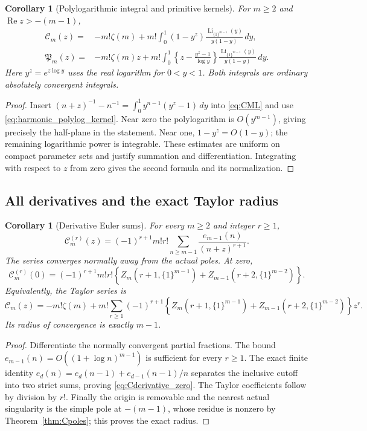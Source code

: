 \documentclass[11pt,a4paper]{article}
\numberwithin{equation}{section}
\newtheorem{corollary}[theorem]{Corollary}
\theoremstyle{definition}
\DeclareMathOperator{\Li}{Li}
\newcommand{\CM}{\mathcal C}
\newcommand{\re}{\operatorname{Re}}
\begin{document}
\begin{corollary}[Polylogarithmic integral and primitive kernels]
\label{cor:Cpolylog}
For $m\ge2$ and $\re z>-(m-1)$,
\begin{align}
 \CM_m(z)={}&-m!\zeta(m)
  +m!\int_0^1(1-y^z)
       \frac{\Li_{\{1\}^{m-1}}(y)}{y(1-y)}\,dy,
 \label{eq:Cpolylog}\\
 \mathfrak P_m(z)={}&-m!\zeta(m)z
  +m!\int_0^1\left\{z-\frac{y^z-1}{\log y}\right\}
       \frac{\Li_{\{1\}^{m-1}}(y)}{y(1-y)}\,dy.
 \label{eq:Ppolylog}
\end{align}
Here $y^z=e^{z\log y}$ uses the real logarithm for $0<y<1$.
Both integrals are ordinary absolutely convergent integrals.
\end{corollary}
\begin{proof}
Insert $(n+z)^{-1}-n^{-1}=\int_0^1y^{n-1}(y^z-1)\,dy$
into \eqref{eq:CML} and use \eqref{eq:harmonic_polylog_kernel}.
Near zero the polylogarithm is $O(y^{m-1})$, giving precisely
the half-plane in the statement. Near one, $1-y^z=O(1-y)$;
the remaining logarithmic power is integrable. These estimates are
uniform on compact parameter sets and justify summation and
differentiation. Integrating with respect to $z$ from zero gives
the second formula and its normalization.
\end{proof}

\subsection{All derivatives and the exact Taylor radius}

\begin{corollary}[Derivative Euler sums]\label{cor:Cderivatives}
For every $m\ge2$ and integer $r\ge1$,
\begin{equation}\label{eq:Cderivatives}
 \CM_m^{(r)}(z)=(-1)^{r+1}m!r!
       \sum_{n\ge m-1}\frac{e_{m-1}(n)}{(n+z)^{r+1}}.
\end{equation}
The series converges normally away from the actual poles. At zero,
\begin{equation}\label{eq:Cderivative_zero}
 \CM_m^{(r)}(0)=(-1)^{r+1}m!r!
  \left\{Z_m(r+1,\{1\}^{m-1})
       +Z_{m-1}(r+2,\{1\}^{m-2})\right\}.
\end{equation}
Equivalently, the Taylor series is
\begin{equation}\label{eq:Ctaylor}
 \CM_m(z)=-m!\zeta(m)
  +m!\sum_{r\ge1}(-1)^{r+1}
  \left\{Z_m(r+1,\{1\}^{m-1})
       +Z_{m-1}(r+2,\{1\}^{m-2})\right\}z^r.
\end{equation}
Its radius of convergence is exactly $m-1$.
\end{corollary}
\begin{proof}
Differentiate the normally convergent partial fractions. The bound
$e_{m-1}(n)=O((1+\log n)^{m-1})$ is sufficient for every
$r\ge1$. The exact finite identity
$e_d(n)=e_d(n-1)+e_{d-1}(n-1)/n$ separates the inclusive
cutoff into two strict sums, proving \eqref{eq:Cderivative_zero}.
The Taylor coefficients follow by division by $r!$. Finally the
origin is removable and the nearest actual singularity is the
simple pole at $-(m-1)$, whose residue is nonzero by
Theorem~\ref{thm:Cpoles}; this proves the exact radius.
\end{proof}
\end{document}
